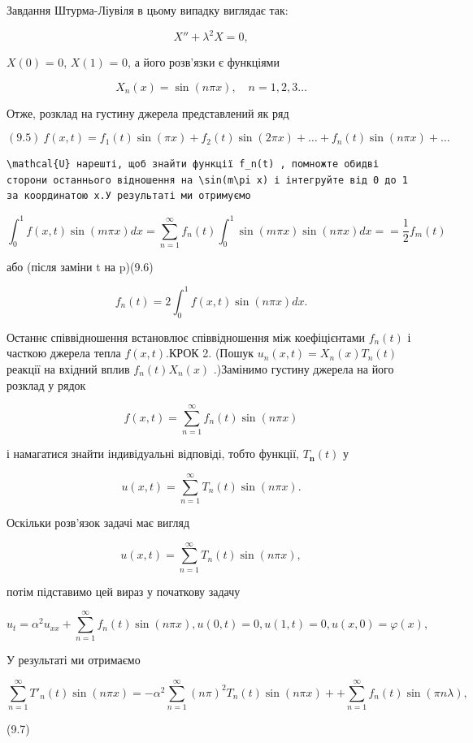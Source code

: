 \documentclass[
  ukrainian,
]{article}
\begin{document}
Завдання Штурма-Ліувіля в цьому випадку виглядає так:

\[
X'' + \lambda^2 X = 0,
\]

\(X(0)\) = 0, \(X(1)\) = 0, а його розв'язки є функціями

\[
X_n(x) = \sin(n\pi x), \quad n = 1, 2, 3 \dots
\]

Отже, розклад на густину джерела представлений як ряд

\[
(9.5) \ f(x,t) = f_1(t) \sin(\pi x) + f_2(t) \sin(2\pi x) + \dots + f_n(t) \sin(n\pi x) + \dots
\]

\begin{verbatim}
\mathcal{U} нарешті, щоб знайти функції f_n(t) , помножте обидві сторони останнього відношення на \sin(m\pi x) і інтегруйте від 0 до 1 за координатою x.У результаті ми отримуємо
\end{verbatim}

\[
\int_{0}^{1} f(x, t) \sin(m\pi x) dx = \sum_{n=1}^{\infty} f_{n}(t) \int_{0}^{1} \sin(m\pi x) \sin(n\pi x) dx =
= \frac{1}{2} f_{m}(t)
\]

або (після заміни t на p)(9.6)

\[
f_{n}(t) = 2 \int_{0}^{1} f(x, t) \sin(n\pi x) dx.
\]

Останнє співвідношення встановлює співвідношення між коефіцієнтами
\(f_n(t)\) і часткою джерела тепла \(f(x, t)\).КРОК 2. (Пошук
\(u_n(x, t) = X_n(x) T_n(t)\) реакції на вхідний вплив \(f_n(t) X_n(x)\)
.)Замінимо густину джерела на його розклад у рядок

\[
f(x, t) = \sum_{n=1}^{\infty} f_n(t) \sin(n\pi x)
\]

і намагатися знайти індивідуальні відповіді, тобто функції,
\(T_{\mathbf{n}}(t)\) у

\[
u(x, t) = \sum_{n=1}^{\infty} T_n(t) \sin(n\pi x).
\]

Оскільки розв'язок задачі має вигляд

\[
u(x, t) = \sum_{n=1}^{\infty} T_n(t) \sin(n\pi x),
\]

потім підставимо цей вираз у початкову задачу

\[
u_{t} = \alpha^{2} u_{xx} + \sum_{n=1}^{\infty} f_{n}(t) \sin(n\pi x),
u(0, t) = 0,
u(1, t) = 0,
u(x, 0) = \varphi(x),
\]

У результаті ми отримаємо

\[
\sum_{n=1}^{\infty} T'_n(t) \sin(n\pi x) = -\alpha^2 \sum_{n=1}^{\infty} (n\pi)^2 T_n(t) \sin(n\pi x) + + \sum_{n=1}^{\infty} f_n(t) \sin(\pi n\lambda),
\]

(9.7)
\end{document}
